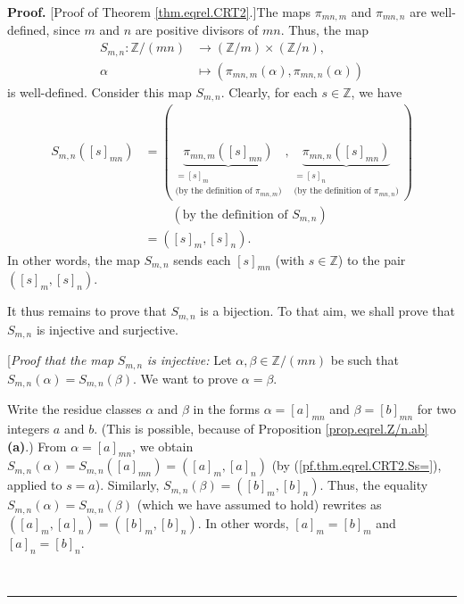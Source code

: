\documentclass[numbers=enddot,12pt,final,onecolumn,notitlepage]{scrartcl}%
\numberwithin{exer}{subsection}
\theoremstyle{definition}
\newenvironment{proof}[1][Proof]{\noindent\textbf{#1.} }{\ \rule{0.5em}{0.5em}}
\begin{document}
\begin{proof}
[Proof of Theorem \ref{thm.eqrel.CRT2}.]The maps $\pi_{mn,m}$ and $\pi_{mn,n}$
are well-defined, since $m$ and $n$ are positive divisors of $mn$. Thus, the
map%
\begin{align*}
S_{m,n}:\mathbb{Z}/\left(  mn\right)   &  \rightarrow\left(  \mathbb{Z}%
/m\right)  \times\left(  \mathbb{Z}/n\right)  ,\\
\alpha &  \mapsto\left(  \pi_{mn,m}\left(  \alpha\right)  ,\pi_{mn,n}\left(
\alpha\right)  \right)
\end{align*}
is well-defined. Consider this map $S_{m,n}$. Clearly, for each $s\in
\mathbb{Z}$, we have%
\begin{align}
S_{m,n}\left(  \left[  s\right]  _{mn}\right)   &  =\left(  \underbrace{\pi
_{mn,m}\left(  \left[  s\right]  _{mn}\right)  }_{\substack{=\left[  s\right]
_{m}\\\text{(by the definition of }\pi_{mn,m}\text{)}}},\underbrace{\pi
_{mn,n}\left(  \left[  s\right]  _{mn}\right)  }_{\substack{=\left[  s\right]
_{n}\\\text{(by the definition of }\pi_{mn,n}\text{)}}}\right) \nonumber\\
&  \ \ \ \ \ \ \ \ \ \ \left(  \text{by the definition of }S_{m,n}\right)
\nonumber\\
&  =\left(  \left[  s\right]  _{m},\left[  s\right]  _{n}\right)  .
\label{pf.thm.eqrel.CRT2.Ss=}%
\end{align}
In other words, the map $S_{m,n}$ sends each $\left[  s\right]  _{mn}$ (with
$s\in\mathbb{Z}$) to the pair $\left(  \left[  s\right]  _{m},\left[
s\right]  _{n}\right)  $.

It thus remains to prove that $S_{m,n}$ is a bijection. To that aim, we shall
prove that $S_{m,n}$ is injective and surjective.

[\textit{Proof that the map }$S_{m,n}$ \textit{is injective:} Let
$\alpha,\beta\in\mathbb{Z}/\left(  mn\right)  $ be such that $S_{m,n}\left(
\alpha\right)  =S_{m,n}\left(  \beta\right)  $. We want to prove $\alpha
=\beta$.

Write the residue classes $\alpha$ and $\beta$ in the forms $\alpha=\left[
a\right]  _{mn}$ and $\beta=\left[  b\right]  _{mn}$ for two integers $a$ and
$b$. (This is possible, because of Proposition \ref{prop.eqrel.Z/n.ab}
\textbf{(a)}.) From $\alpha=\left[  a\right]  _{mn}$, we obtain $S_{m,n}%
\left(  \alpha\right)  =S_{m,n}\left(  \left[  a\right]  _{mn}\right)
=\left(  \left[  a\right]  _{m},\left[  a\right]  _{n}\right)  $ (by
(\ref{pf.thm.eqrel.CRT2.Ss=}), applied to $s=a$). Similarly, $S_{m,n}\left(
\beta\right)  =\left(  \left[  b\right]  _{m},\left[  b\right]  _{n}\right)
$. Thus, the equality $S_{m,n}\left(  \alpha\right)  =S_{m,n}\left(
\beta\right)  $ (which we have assumed to hold) rewrites as $\left(  \left[
a\right]  _{m},\left[  a\right]  _{n}\right)  =\left(  \left[  b\right]
_{m},\left[  b\right]  _{n}\right)  $. In other words, $\left[  a\right]
_{m}=\left[  b\right]  _{m}$ and $\left[  a\right]  _{n}=\left[  b\right]
_{n}$.


\end{proof}
\end{document}
